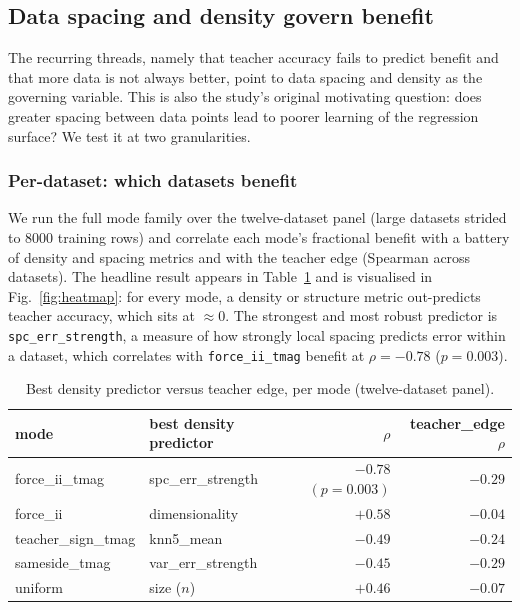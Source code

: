 \subsection{Data spacing and density govern benefit}
\label{sec:spacing}

The recurring threads, namely that teacher accuracy fails to predict benefit and that more
data is not always better, point to data spacing and density as the governing variable.
This is also the study's original motivating question: does greater spacing between data
points lead to poorer learning of the regression surface? We test it at two granularities.

\subsubsection{Per-dataset: which datasets benefit}

We run the full mode family over the twelve-dataset panel (large datasets strided to $8000$
training rows) and correlate each mode's fractional benefit with a battery of
density and spacing metrics and with the teacher edge (Spearman across datasets). The
headline result appears in Table~\ref{tab:density} and is visualised in
Fig.~\ref{fig:heatmap}: for every mode, a density or structure metric out-predicts teacher
accuracy, which sits at $\approx\!0$. The strongest and most robust predictor is
\texttt{spc\_err\_strength}, a measure of how strongly local spacing predicts error within
a dataset, which correlates with \texttt{force\_ii\_tmag} benefit at $\rho = -0.78$
($p=0.003$).

\begin{table}[t]
\centering
\caption{Best density predictor versus teacher edge, per mode (twelve-dataset panel).}
\label{tab:density}
\begin{tabular}{llrr}
\toprule
mode & best density predictor & $\rho$ & teacher\_edge $\rho$ \\
\midrule
force\_ii\_tmag    & spc\_err\_strength & $\mathbf{-0.78}$ $(p{=}0.003)$ & $-0.29$ \\
force\_ii          & dimensionality     & $+0.58$ & $-0.04$ \\
teacher\_sign\_tmag& knn5\_mean         & $-0.49$ & $-0.24$ \\
sameside\_tmag     & var\_err\_strength & $-0.45$ & $-0.29$ \\
uniform            & size ($n$)         & $+0.46$ & $-0.07$ \\
\bottomrule
\end{tabular}
\end{table}

